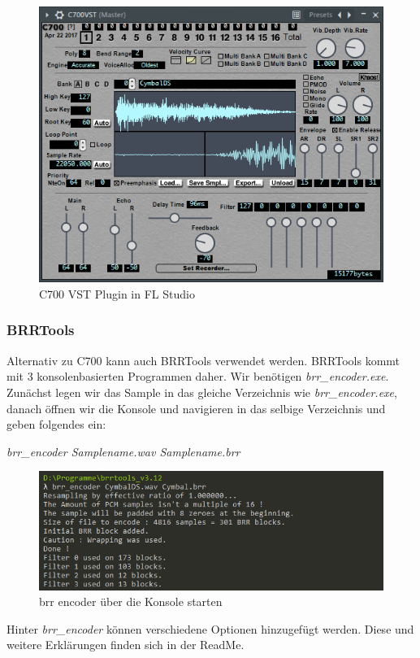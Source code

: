 \begin{figure}[htbp] \centering
	\includegraphics[width=.95\linewidth]{images/C700.png}
	\caption{C700 VST Plugin in FL Studio}
	\label{C700}
\end{figure}

\subsubsection*{BRRTools}

Alternativ zu C700 kann auch BRRTools verwendet werden. BRRTools kommt mit 3 konsolenbasierten Programmen daher. Wir benötigen \textit{brr\_encoder.exe}. Zunächst legen wir das Sample in das gleiche Verzeichnis wie \textit{brr\_encoder.exe}, danach öffnen wir die Konsole und navigieren in das selbige Verzeichnis und geben folgendes ein:

\bigskip

\textit{brr\_encoder Samplename.wav Samplename.brr}

\bigskip

\begin{figure}[htbp] \centering
	\includegraphics[width=.95\linewidth]{images/BRRTools.png}
	\caption{brr encoder über die Konsole starten}
	\label{BRRTools}
\end{figure}

Hinter \textit{brr\_encoder} können verschiedene Optionen hinzugefügt werden. Diese und weitere Erklärungen finden sich in der ReadMe.

\newpage
